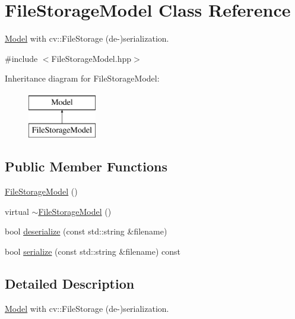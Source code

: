 \hypertarget{classFileStorageModel}{\section{\-File\-Storage\-Model \-Class \-Reference}
\label{classFileStorageModel}
}


\hyperlink{classModel}{\-Model} with cv\-::\-File\-Storage (de-\/)serialization.  




{\ttfamily \#include $<$\-File\-Storage\-Model.\-hpp$>$}

\-Inheritance diagram for \-File\-Storage\-Model\-:\begin{figure}[H]
\begin{center}
\leavevmode
\includegraphics[height=2.000000cm]{classFileStorageModel}
\end{center}
\end{figure}
\subsection*{\-Public \-Member \-Functions}
\begin{DoxyCompactItemize}
\item 
\hyperlink{classFileStorageModel_a4a9563fed1ae1a659466d64ee8890653}{\-File\-Storage\-Model} ()
\item 
virtual \hyperlink{classFileStorageModel_aba448d7c91c33e63cdfc95c8580fd834}{$\sim$\-File\-Storage\-Model} ()
\item 
bool \hyperlink{classFileStorageModel_af97e8cf0ced06893ffca6ec119a31143}{deserialize} (const std\-::string \&filename)
\item 
bool \hyperlink{classFileStorageModel_acc945cf6792663f84f1302e926dca63d}{serialize} (const std\-::string \&filename) const 
\end{DoxyCompactItemize}


\subsection{\-Detailed \-Description}
\hyperlink{classModel}{\-Model} with cv\-::\-File\-Storage (de-\/)serialization. 

